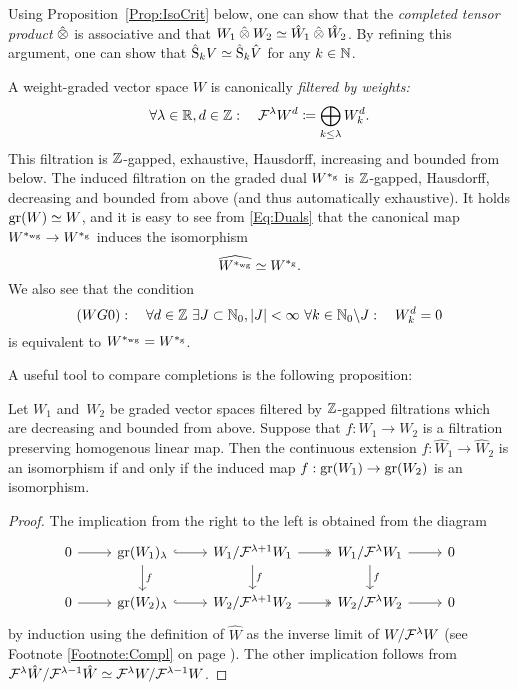 \documentclass[\MainFolder/Text.tex]{subfiles}
\begin{document}
\begin{Remark}\label{Rem:ComplTens}
Using Proposition~\ref{Prop:IsoCrit} below, one can show that the \emph{completed tensor product} $\COtimes$ is associative and that $W_1 \COtimes W_2 \simeq \hat{W}_1 \COtimes \hat{W}_2$. By refining this argument, one can show that $\hat{\mathrm{S}}_k V \simeq \hat{\mathrm{S}}_k\hat{V}$ for any $k\in \mathbb{N}$.
\end{Remark}

A weight-graded vector space $W$ is canonically \emph{filtered by weights:}
\begin{equation}\label{Eq:FiltrWeights}
\forall \lambda\in \mathbb{R}, d\in \mathbb{Z}:\quad\mathcal{F}^\lambda W^d \coloneqq \bigoplus_{k\le \lambda} W_k^d.
\end{equation}
This filtration is $\mathbb{Z}$-gapped, exhaustive, Hausdorff, increasing and bounded from below. The induced filtration on the graded dual $W^{*_{\mathrm{g}}}$ is $\mathbb{Z}$-gapped, Hausdorff, decreasing and bounded from above (and thus automatically exhaustive). It holds $\operatorname{\mathrm{gr}}(W) \simeq W$, and it is easy to see from \eqref{Eq:Duals} that the canonical map $W^{*_{\mathrm{wg}}} \rightarrow W^{*_{\mathrm{g}}}$ induces the isomorphism
\[ \widehat{W^{*_{\mathrm{wg}}}} \simeq W^{*_{\mathrm{g}}}. \]
We also see that the condition
\[ (WG0): \quad \forall d\in \mathbb{Z}\ \exists J\subset \mathbb{N}_0, |J|<\infty\ \forall k\in \mathbb{N}_0\backslash J: \quad W_k^d = 0 \]
is equivalent to $W^{*_{\mathrm{wg}}}= W^{*_{\mathrm{g}}}$.

A useful tool to compare completions is the following proposition:

\begin{Proposition}\label{Prop:IsoCrit}
Let $W_1$ and~$W_2$ be graded vector spaces filtered by $\mathbb{Z}$-gapped filtrations which are decreasing and bounded from above. Suppose that $f: W_1 \rightarrow W_2$ is a filtration preserving homogenous linear map. Then the continuous extension $f: \hat{W}_1 \rightarrow \hat{W}_2$ is an isomorphism if and only if the induced map $f: \operatorname{\mathrm{gr}}(W_1) \rightarrow \operatorname{\mathrm{gr}}(W_2)$ is an isomorphism.
\end{Proposition}
\begin{proof}
The implication from the right to the left is obtained from the diagram 
\[\begin{tikzcd}
0 \arrow{r} & \Gr(W_1)_\lambda \arrow[hook]{r} \arrow{d}{f} & W_1/\Filtr^{\lambda + 1}W_1 \arrow[two heads]{r} \arrow{d}{f} & W_1/\Filtr^{\lambda} W_1 \arrow{r}   \arrow{d}{f} & 0 \\
0 \arrow{r} & \Gr(W_2)_\lambda \arrow[hook]{r} & W_2/\Filtr^{\lambda+1}W_2 \arrow[two heads]{r} & \arrow{r}W_2/\Filtr^{\lambda} W_2   & 0
\end{tikzcd}\]
by induction using the definition of $\hat{W}$ as the inverse limit of $W/\mathcal{F}^\lambda W$ (see Footnote \ref{Footnote:Compl} on page \pageref{Footnote:Compl}). The other implication follows from $\mathcal{F}^\lambda\hat{W}/\mathcal{F}^{\lambda-1}\hat{W}\simeq\mathcal{F}^\lambda W/\mathcal{F}^{\lambda-1}W$.
\end{proof}
\end{document}
